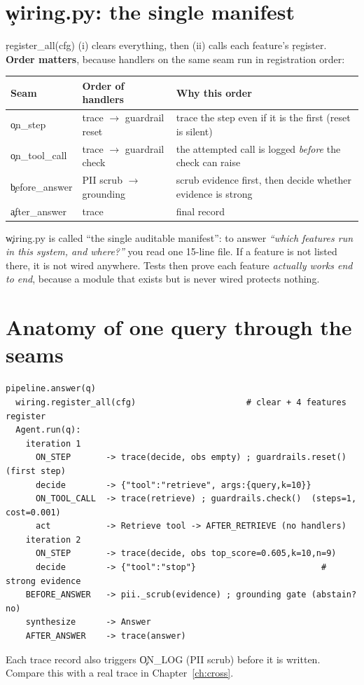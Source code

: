 \section{\c{wiring.py}: the single manifest}
\c{register\_all(cfg)} (i) clears everything, then (ii) calls each feature's \c{register}. \textbf{Order matters}, because handlers on the same seam run in registration order:
\begin{center}\begin{tabular}{@{}lll@{}}\toprule Seam & Order of handlers & Why this order \\ \midrule
\c{on\_step} & trace $\to$ guardrail reset & trace the step even if it is the first (reset is silent) \\
\c{on\_tool\_call} & trace $\to$ guardrail check & the attempted call is logged \emph{before} the check can raise \\
\c{before\_answer} & PII scrub $\to$ grounding & scrub evidence first, then decide whether evidence is strong \\
\c{after\_answer} & trace & final record \\ \bottomrule\end{tabular}\end{center}
\begin{why}
\c{wiring.py} is called ``the single auditable manifest'': to answer \emph{``which features run in this system, and where?''} you read one 15-line file. If a feature is not listed there, it is not wired anywhere. Tests then prove each feature \emph{actually works end to end}, because a module that exists but is never wired protects nothing.
\end{why}

\section{Anatomy of one query through the seams}
\begin{lstlisting}[style=plain]
pipeline.answer(q)
  wiring.register_all(cfg)                      # clear + 4 features register
  Agent.run(q):
    iteration 1
      ON_STEP       -> trace(decide, obs empty) ; guardrails.reset()   (first step)
      decide        -> {"tool":"retrieve", args:{query,k=10}}
      ON_TOOL_CALL  -> trace(retrieve) ; guardrails.check()  (steps=1, cost=0.001)
      act           -> Retrieve tool -> AFTER_RETRIEVE (no handlers)
    iteration 2
      ON_STEP       -> trace(decide, obs top_score=0.605,k=10,n=9)
      decide        -> {"tool":"stop"}                         # strong evidence
    BEFORE_ANSWER   -> pii._scrub(evidence) ; grounding gate (abstain? no)
    synthesize      -> Answer
    AFTER_ANSWER    -> trace(answer)
\end{lstlisting}
Each trace record also triggers \c{ON\_LOG} (PII scrub) before it is written. Compare this with a real trace in Chapter~\ref{ch:cross}.

